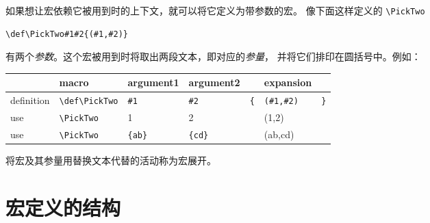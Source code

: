 \documentclass{book}
\begin{document}
如果想让宏依赖它被用到时的上下文，就可以将它定义为带参数的宏。
像下面这样定义的 \verb+\PickTwo+
\begin{verbatim}
\def\PickTwo#1#2{(#1,#2)}
\end{verbatim}
有两个\emph{参数}。这个宏被用到时将取出两段文本，即对应的\emph{参量}，
并将它们排印在圆括号中。例如：

\begin{tabular}{|l|llllll|}
\hline
          &macro              &argument1& argument2& 
    &expansion&\\ \hline
definition&\verb+\def\PickTwo+&\verb+#1+& \verb+#2+& \verb+{+& 
    \verb+(#1,#2)+& \verb+}+\\
use&       \verb+\PickTwo+&1&2&&(1,2)&\\
use&       \verb+\PickTwo+&\verb+{ab}+&\verb+{cd}+&&(ab,cd)&\\
\hline
\end{tabular}

将宏及其参量用替换文本代替的活动称为{\italic 宏展开}。

\section{宏定义的结构}
\end{document}

